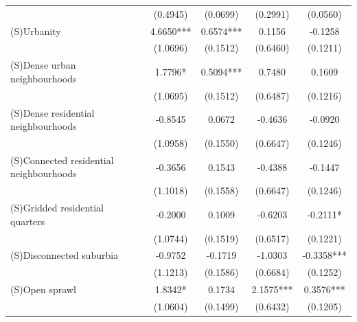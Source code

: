 \begin{table}
\begin{tabular}{lcccc}
                                                                  &    (0.4945) &        (0.0699) &     (0.2991) &          (0.0560) \\
                (S)Urbanity                                       &   4.6650*** &       0.6574*** &       0.1156 &           -0.1258 \\
                                                                  &    (1.0696) &        (0.1512) &     (0.6460) &          (0.1211) \\
                (S)Dense urban neighbourhoods                     &     1.7796* &       0.5094*** &       0.7480 &            0.1609 \\
                                                                  &    (1.0695) &        (0.1512) &     (0.6487) &          (0.1216) \\
                (S)Dense residential neighbourhoods               &     -0.8545 &          0.0672 &      -0.4636 &           -0.0920 \\
                                                                  &    (1.0958) &        (0.1550) &     (0.6647) &          (0.1246) \\
                (S)Connected residential neighbourhoods           &     -0.3656 &          0.1543 &      -0.4388 &           -0.1447 \\
                                                                  &    (1.1018) &        (0.1558) &     (0.6647) &          (0.1246) \\
                (S)Gridded residential quarters                   &     -0.2000 &          0.1009 &      -0.6203 &          -0.2111* \\
                                                                  &    (1.0744) &        (0.1519) &     (0.6517) &          (0.1221) \\
                (S)Disconnected suburbia                          &     -0.9752 &         -0.1719 &      -1.0303 &        -0.3358*** \\
                                                                  &    (1.1213) &        (0.1586) &     (0.6684) &          (0.1252) \\
                (S)Open sprawl                                    &     1.8342* &          0.1734 &    2.1575*** &         0.3576*** \\
                                                                  &    (1.0604) &        (0.1499) &     (0.6432) &          (0.1205) \\

\end{tabular}
\end{table}
